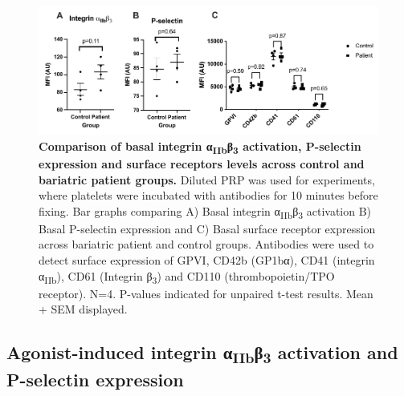 \documentclass[11pt,twoside]{bristolthesis}
\begin{document}
\begin{figure}
\includegraphics[width=0.9\linewidth]{figure/Bariatric_study/Basal_surface_receptors} \caption[Comparison of basal integrin α\textsubscript{IIb}β\textsubscript{3} activation, P-selectin expression and surface receptors levels across control and bariatric patient groups]{\textbf{Comparison of basal integrin α\textsubscript{IIb}β\textsubscript{3} activation, P-selectin expression and surface receptors levels across control and bariatric patient groups.} Diluted PRP was used for experiments, where platelets were incubated with antibodies for 10 minutes before fixing. Bar graphs comparing A) Basal integrin α\textsubscript{IIb}β\textsubscript{3} activation B) Basal P-selectin expression and C) Basal surface receptor expression across bariatric patient and control groups. Antibodies were used to detect surface expression of GPVI, CD42b (GP1bα), CD41 (integrin α\textsubscript{IIb}), CD61 (Integrin β\textsubscript{3}) and CD110 (thrombopoietin/TPO receptor). N=4. P-values indicated for unpaired t-test results. Mean + SEM displayed.}\label{fig:basal-integrin-pselectin-receptor-bariatric}
\end{figure}
\hypertarget{agonist-induced-integrin-ux3b1iibux3b23-activation-and-p-selectin-expression}{%
\subsection{\texorpdfstring{Agonist-induced integrin α\textsubscript{IIb}β\textsubscript{3} activation and P-selectin expression}{Agonist-induced integrin αIIbβ3 activation and P-selectin expression}}\label{agonist-induced-integrin-ux3b1iibux3b23-activation-and-p-selectin-expression}}
\end{document}
